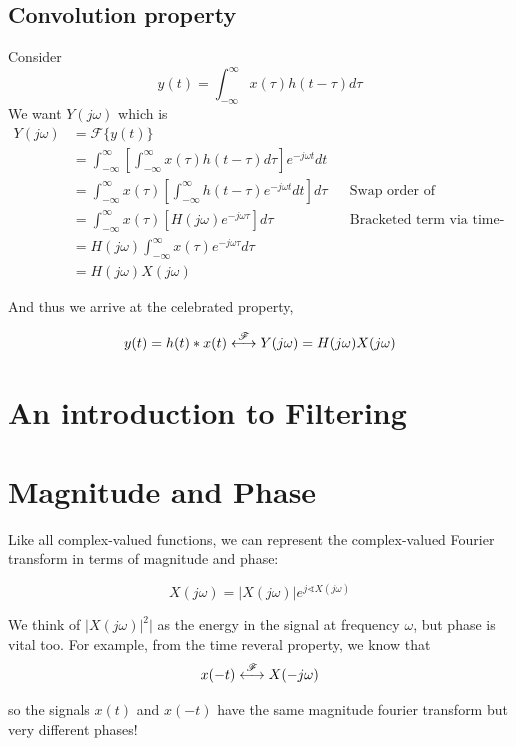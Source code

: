 \subsection{Convolution property}
Consider 
\[
y(t) = \int_{-\infty}^{\infty}x(\tau) h(t-\tau) d\tau
\]
We want $Y(j\omega)$ which is 
\begin{align}
Y(j\omega) &= \mathscr{F} \{ y(t) \} \\
&= \int_{-\infty}^{\infty} \left[ \int_{-\infty}^{\infty}x(\tau) h(t-\tau) d\tau \right]  e^{-j \omega t} dt \\
& = \int_{-\infty}^{\infty} x(\tau) \left[ \int_{-\infty}^{\infty}h(t-\tau) e^{-j\omega t} dt \right]  d\tau && \text{Swap order of integration}\\
& = \int_{-\infty}^{\infty} x(\tau) \left[ H(j\omega) e^{-j\omega \tau} \right] d\tau  && \text{Bracketed term via time-shifting}\\
& = H(j\omega) \int_{-\infty}^{\infty} x(\tau) e^{-j\omega \tau} d\tau \\
& = H(j\omega) X(j\omega) 
\end{align}


And thus we arrive at the celebrated property, 


\[
y(t) = h(t) * x(t) \stackrel{\mathscr{F}}{\longleftrightarrow} Y(j\omega) = H(j\omega) X(j\omega)  
\]




\section{An introduction to Filtering}





\section{Magnitude and Phase}
Like all complex-valued functions, we can represent the complex-valued Fourier transform 
in terms of magnitude and phase:

\[
X(j\omega) = |X(j\omega)| e^{j\sphericalangle X(j\omega)}
\]

We think of $|X(j\omega)|^2|$ as the energy in the signal at frequency $\omega$, 
but phase is vital too. For example, from the time reveral property, we 
know that 
\[
x(-t)  \stackrel{\mathscr{F}}{\longleftrightarrow} X(-j\omega)
\]

so the signals $x(t)$ and $x(-t)$ have the same magnitude fourier transform but 
very different phases! 



